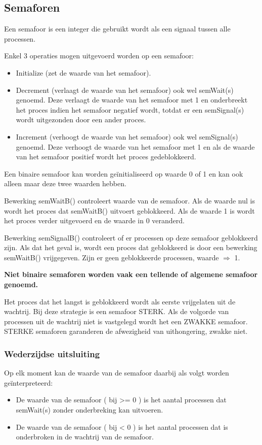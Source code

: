 \subsection{Semaforen}

Een semafoor is een integer die gebruikt wordt als een signaal tussen alle processen. 

Enkel 3 operaties mogen uitgevoerd worden op een semafoor:

\begin{itemize}
\item Initialize (zet de waarde van het semafoor).
\item Decrement (verlaagt de waarde van het semafoor) ook wel semWait(s) genoemd. Deze verlaagt de waarde van het semafoor met 1 en onderbreekt het proces indien het semafoor negatief wordt, totdat er een semSignal(s) wordt uitgezonden door een ander proces.
\item Increment (verhoogt de waarde van het semafoor) ook wel semSignal(s) genoemd. Deze verhoogt de waarde van het semafoor met 1 en als de waarde van het semafoor positief wordt het proces gedeblokkeerd.
\end{itemize}




Een binaire semafoor kan worden geïnitialiseerd op waarde 0 of 1 en kan ook alleen maar deze twee waarden hebben.

Bewerking semWaitB() controleert waarde van de semafoor. Als de waarde nul is wordt het proces dat semWaitB() uitvoert geblokkeerd. Als de waarde 1 is wordt het proces verder uitgevoerd en de waarde in 0 veranderd.

Bewerking semSignalB() controleert of er processen op deze semafoor geblokkeerd zijn. Als dat het geval is, wordt een proces dat geblokkeerd is door een bewerking semWaitB() vrijgegeven. Zijn er geen geblokkeerde processen, waarde $\Rightarrow$ 1.

\textbf{Niet binaire semaforen worden vaak een tellende of algemene semafoor genoemd.}

Het proces dat het langst is geblokkeerd wordt als eerste vrijgelaten uit de wachtrij. Bij deze strategie is een semafoor STERK. Als de volgorde van processen uit de wachtrij niet is vastgelegd wordt het een ZWAKKE semafoor. STERKE semaforen garanderen de afwezigheid van uithongering, zwakke niet.


\subsubsection{Wederzijdse uitsluiting}

Op elk moment kan de waarde van de semafoor daarbij als volgt worden geïnterpreteerd:

\begin{itemize}
\item De waarde van de semafoor ( bij >= 0 ) is het aantal processen dat semWait(s) zonder onderbreking kan uitvoeren.
\item De waarde van de semafoor ( bij < 0 ) is het aantal processen dat is onderbroken in de wachtrij van de semafoor.
\end{itemize}